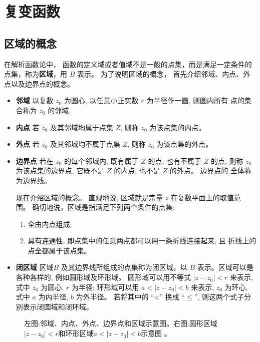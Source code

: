 
\section{复变函数}
\label{sec:complexfunctions}


\subsection{区域的概念}
\label{sub:domain}
在解析函数论中， 函数的定义域或者值域不是一般的点集，而是满足一定条件的点集，称为{\bf 区域}，用 $B$ 表示。
为了说明区域的概念， 首先介绍邻域、内点、外点以及边界点的概念。
\begin{itemize}
\item {\bf 邻域} \quad 以复数 $z_0$ 为圆心, 以任意小正实数 $\varepsilon$ 为半径作一圆, 则圆内所有 点的集合称为 $z_0$ 的邻域.
\item {\bf 内点} \quad 若 $z_0$ 及其邻域均属于点集 $Z$, 则称 $z_0$ 为该点集的内点。
\item {\bf 外点} \quad 若 $z_0$ 及其邻域均不属于点集 $Z$, 则称 $z_0$ 为该点集的外点。
\item {\bf 边界点}  \quad 若在 $z_0$ 的每个邻域内, 既有属于 $Z$ 的点, 也有不属于 $Z$ 的点, 则称 $z_0$ 为该点集的边界点, 它既不是 $Z$ 的内点, 也不是 $Z$ 的外点。 边界点的 全体称为边界线。

现在介绍区域的概念。 直观地说, 区域就是宗量 $z$ 在复数平面上的取值范 围。 确切地说，区域是指满足下列两个条件的点集:
    \begin{enumerate}
        \item 全由内点组成;
        \item 具有连通性, 即点集中的任意两点都可以用一条折线连接起来, 且 折线上的点全都属于该点集。
    \end{enumerate}
\item {\bf 闭区域} 区域$B$ 及其边界线所组成的点集称为闭区域，以 $\bar{B}$ 表示。区域可以是各种各样的, 例如圆形域及环形域。 
圆形域可以用不等式 $\left|z-z_0\right|<r$ 来表示, 式中 $z_0$ 为圆心, $r$ 为半径; 
环形域可以用 $a<\left|z-z_0\right|<b$ 来表示, $z_0$ 为环心, 式中 $a$ 为内半径, $b$ 为外半径。
 若将其中的 “<” 换成 $“ \leqslant ”$, 则这两个式子分别表示闭圆域和闭环域。
\end{itemize}

\begin{figure}
    \centering
    
    \quad
    
    \caption{左图:邻域、内点、外点、边界点和区域示意图。右图:圆形区域$\left|z-z_0\right|<r$和环形区域$a<\left|z-z_0\right|<b$示意图 。}
\end{figure}



